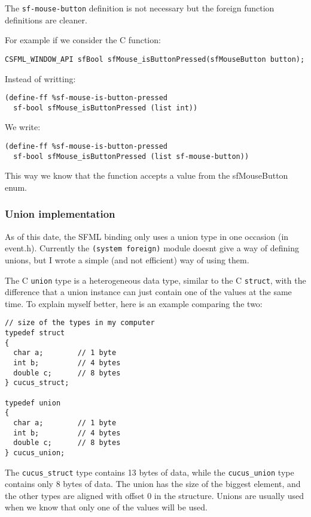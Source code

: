 \documentclass[latterpaper, leqno]{article}
\begin{document}
The \texttt{sf-mouse-button} definition is not necessary but the foreign function definitions are cleaner.

For example if we consider the C function:

\begin{verbatim}
CSFML_WINDOW_API sfBool sfMouse_isButtonPressed(sfMouseButton button);
\end{verbatim}

Instead of writting:

\begin{verbatim}
(define-ff %sf-mouse-is-button-pressed
  sf-bool sfMouse_isButtonPressed (list int))
\end{verbatim}

We write:

\begin{verbatim}
(define-ff %sf-mouse-is-button-pressed
  sf-bool sfMouse_isButtonPressed (list sf-mouse-button))
\end{verbatim}

This way we know that the function accepts a value from the sfMouseButton enum.

\subsubsection*{Union implementation}
As of this date, the SFML binding only uses a union type in one occasion (in event.h). Currently the \texttt{(system foreign)} module doesnt give a way of defining unions, but I wrote a simple (and not efficient) way of using them.

The C \texttt{union} type is a heterogeneous data type, similar to the C \texttt{struct}, with the difference that a union instance can just contain one of the values at the same time. To explain myself better, here is an example comparing the two:

\begin{verbatim}
// size of the types in my computer
typedef struct
{
  char a;        // 1 byte
  int b;         // 4 bytes
  double c;      // 8 bytes
} cucus_struct;

typedef union
{
  char a;        // 1 byte
  int b;         // 4 bytes
  double c;      // 8 bytes
} cucus_union;
\end{verbatim}

The \texttt{cucus\_struct} type contains 13 bytes of data, while the \texttt{cucus\_union} type contains only 8 bytes of data. The union has the size of the biggest element, and the other types are aligned with offset 0 in the structure. Unions are usually used when we know that only one of the values will be used.
\end{document}
